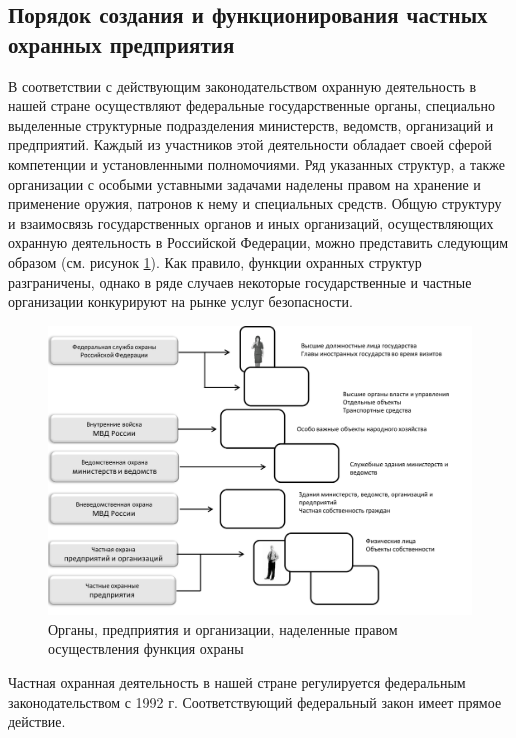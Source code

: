 \documentclass[a4paper,12pt,fleqn]{article} %
\begin{document}
\subsection{Порядок создания и функционирования частных охранных предприятия}

В соответствии с действующим законодательством охранную деятельность в нашей стране осуществляют федеральные государственные органы, специально выделенные структурные подразделения министерств, ведомств, организаций и предприятий. Каждый из участников этой деятельности обладает своей сферой компетенции и установленными полномочиями. Ряд указанных структур, а также организации с особыми уставными задачами наделены правом на хранение и применение оружия, патронов к нему и специальных средств. Общую структуру и взаимосвязь государственных органов и иных организаций, осуществляющих охранную деятельность в Российской Федерации, можно представить следующим образом (см. рисунок \ref{image5}). Как правило, функции охранных структур разграничены, однако в ряде случаев некоторые государственные и частные организации конкурируют на рынке услуг безопасности.

\begin{figure}[h]
	\centering
	\includegraphics[scale=0.7]{img5}
	\caption{Органы, предприятия и организации, наделенные правом осуществления функция охраны}
	\label{image5}
\end{figure}

Частная охранная деятельность в нашей стране регулируется федеральным законодательством с 1992 г. Соответствующий федеральный закон имеет прямое действие. \\

\end{document}
